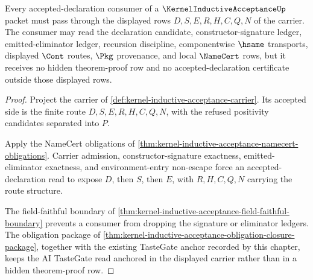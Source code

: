 \begin{theorem}
\label{thm:kernel-inductive-acceptance-accepted-declaration-route}
Every accepted-declaration consumer of a $\KernelInductiveAcceptanceUp$ packet must pass through the displayed rows $D,S,E,R,H,C,Q,N$ of the carrier. The consumer may read the declaration candidate, constructor-signature ledger, emitted-eliminator ledger, recursion discipline, componentwise $\hsame$ transports, displayed $\Cont$ routes, $\Pkg$ provenance, and local $\NameCert$ rows, but it receives no hidden theorem-proof row and no accepted-declaration certificate outside those displayed rows.
\end{theorem}
\begin{proof}
Project the carrier of \autoref{def:kernel-inductive-acceptance-carrier}. Its accepted side is the finite route $D,S,E,R,H,C,Q,N$, with the refused positivity candidates separated into $P$.

Apply the NameCert obligations of \autoref{thm:kernel-inductive-acceptance-namecert-obligations}. Carrier admission, constructor-signature exactness, emitted-eliminator exactness, and environment-entry non-escape force an accepted-declaration read to expose $D$, then $S$, then $E$, with $R,H,C,Q,N$ carrying the route structure.

The field-faithful boundary of \autoref{thm:kernel-inductive-acceptance-field-faithful-boundary} prevents a consumer from dropping the signature or eliminator ledgers. The obligation package of \autoref{thm:kernel-inductive-acceptance-obligation-closure-package}, together with the existing TasteGate anchor recorded by this chapter, keeps the AI TasteGate read anchored in the displayed carrier rather than in a hidden theorem-proof row.
\end{proof}

